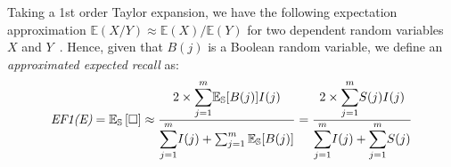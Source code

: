  
Taking a 1st order Taylor expansion, we have the following expectation approximation %
$\mathbb{E}(X/Y)\approx \mathbb{E}(X)/ \mathbb{E}(Y)$ for two dependent random variables $X$ and $Y$~\cite{Kempen2000}. Hence, given that $B(j)$ is a Boolean random variable, we define an \emph{approximated expected recall} as: 
\begin{equation}
\emph{EF1(E)}=\mathbb{E_{S}}\left[\Box\right]\approx\dfrac{2\times{\displaystyle \sum_{j=1}^{m}}\mathbb{E_{S}}[B(j)]I(j)}{{\displaystyle \sum_{j=1}^{m}}I(j)+\sum_{j=1}^{m}\mathbb{E_{S}}[B(j)]}=\dfrac{2\times{\displaystyle \sum_{j=1}^{m}}S(j)I(j)}{{\displaystyle \sum_{j=1}^{m}}I(j)+{\displaystyle \sum_{j=1}^{m}}S(j)}
\end{equation}
  






